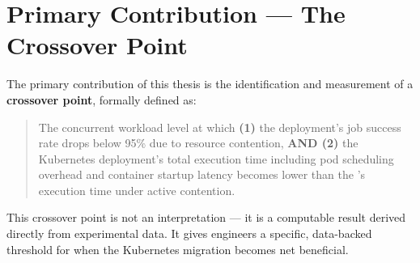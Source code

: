 \section{Primary Contribution --- The Crossover Point}

The primary contribution of this thesis is the identification and measurement of a
\textbf{crossover point}, formally defined as:

\begin{quote}
The concurrent workload level at which \textbf{(1)} the \vm{} deployment's job success rate
drops below 95\% due to resource contention, \textbf{AND (2)} the Kubernetes deployment's
total execution time including pod scheduling overhead and container startup latency becomes
lower than the \vm{}'s execution time under active contention.
\end{quote}

This crossover point is not an interpretation --- it is a computable result derived directly
from experimental data. It gives engineers a specific, data-backed threshold for when the
Kubernetes migration becomes net beneficial.
